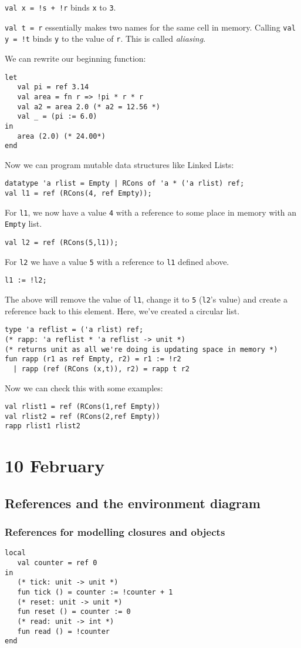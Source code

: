 \documentclass[11pt]{article}
\begin{document}
\verb~val x = !s + !r~ binds \verb~x~ to \verb~3~.

\verb~val t = r~ essentially makes two names for the same cell in memory. Calling \verb~val y = !t~ binds \verb~y~ to the value of \verb~r~. This is called \emph{aliasing}.

We can rewrite our beginning function:
\begin{verbatim}
let
   val pi = ref 3.14
   val area = fn r => !pi * r * r
   val a2 = area 2.0 (* a2 = 12.56 *)
   val _ = (pi := 6.0)
in
   area (2.0) (* 24.00*)
end
\end{verbatim}

Now we can program mutable data structures like Linked Lists:
\begin{verbatim}
datatype 'a rlist = Empty | RCons of 'a * ('a rlist) ref;
val l1 = ref (RCons(4, ref Empty));
\end{verbatim}
For \verb~l1~, we now have a value \verb~4~ with a reference to some place in memory with an \verb~Empty~ list.
\begin{verbatim}
val l2 = ref (RCons(5,l1));
\end{verbatim}
For \verb~l2~ we have a value \verb~5~ with a reference to \verb~l1~ defined above.
\begin{verbatim}
l1 := !l2;
\end{verbatim}
The above will remove the value of \verb~l1~, change it to \verb~5~ (\verb~l2~'s value) and create a reference back to this element. Here, we've created a circular list.
\begin{verbatim}
type 'a reflist = ('a rlist) ref;
(* rapp: 'a reflist * 'a reflist -> unit *)
(* returns unit as all we're doing is updating space in memory *)
fun rapp (r1 as ref Empty, r2) = r1 := !r2
  | rapp (ref (RCons (x,t)), r2) = rapp t r2
\end{verbatim}
Now we can check this with some examples:
\begin{verbatim}
val rlist1 = ref (RCons(1,ref Empty))
val rlist2 = ref (RCons(2,ref Empty))
rapp rlist1 rlist2
\end{verbatim}


\section{10 February}
\subsection{References and the environment diagram}
\subsubsection{References for modelling closures and objects}
\begin{verbatim}
local
   val counter = ref 0
in
   (* tick: unit -> unit *)
   fun tick () = counter := !counter + 1
   (* reset: unit -> unit *)
   fun reset () = counter := 0
   (* read: unit -> int *)
   fun read () = !counter
end
\end{verbatim}
\end{document}
